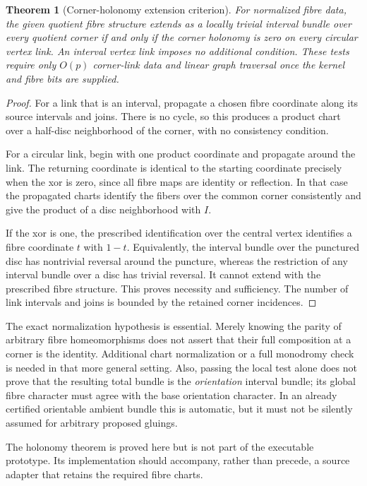 \documentclass[11pt]{article}
\newtheorem{theorem}{Theorem}[section]
\theoremstyle{definition}
\theoremstyle{remark}\newtheorem{remark}[theorem]{Remark}
\begin{document}
\begin{theorem}[Corner-holonomy extension criterion]\label{thm:holonomy}
For normalized fibre data, the given quotient fibre structure extends as a locally trivial interval bundle over every quotient corner if and only if the corner holonomy is zero on every circular vertex link. An interval vertex link imposes no additional condition. These tests require only $O(p)$ corner-link data and linear graph traversal once the kernel and fibre bits are supplied.
\end{theorem}
\begin{proof}
For a link that is an interval, propagate a chosen fibre coordinate along its source intervals and joins. There is no cycle, so this produces a product chart over a half-disc neighborhood of the corner, with no consistency condition.

For a circular link, begin with one product coordinate and propagate around the link. The returning coordinate is identical to the starting coordinate precisely when the xor is zero, since all fibre maps are identity or reflection. In that case the propagated charts identify the fibers over the common corner consistently and give the product of a disc neighborhood with $I$.

If the xor is one, the prescribed identification over the central vertex identifies a fibre coordinate $t$ with $1-t$. Equivalently, the interval bundle over the punctured disc has nontrivial reversal around the puncture, whereas the restriction of any interval bundle over a disc has trivial reversal. It cannot extend with the prescribed fibre structure. This proves necessity and sufficiency. The number of link intervals and joins is bounded by the retained corner incidences.
\end{proof}

The exact normalization hypothesis is essential. Merely knowing the parity of arbitrary fibre homeomorphisms does not assert that their full composition at a corner is the identity. Additional chart normalization or a full monodromy check is needed in that more general setting. Also, passing the local test alone does not prove that the resulting total bundle is the \emph{orientation} interval bundle; its global fibre character must agree with the base orientation character. In an already certified orientable ambient bundle this is automatic, but it must not be silently assumed for arbitrary proposed gluings.

The holonomy theorem is proved here but is not part of the executable prototype. Its implementation should accompany, rather than precede, a source adapter that retains the required fibre charts.
\end{document}
